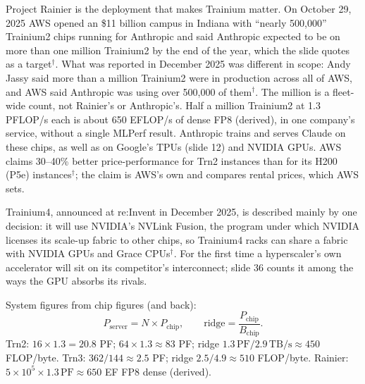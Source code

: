 \documentclass[11pt,letterpaper]{article}
\newenvironment{formulas}{\begin{tcolorbox}[formulabox]}{\end{tcolorbox}}
\begin{document}
Project Rainier is the deployment that makes Trainium matter. On October 29, 2025 AWS opened an \$11 billion campus in Indiana with ``nearly 500{,}000'' Trainium2 chips running for Anthropic and said Anthropic expected to be on more than one million Trainium2 by the end of the year, which the slide quotes as a target$^\dagger$. What was reported in December 2025 was different in scope: Andy Jassy said more than a million Trainium2 were in production across all of AWS, and AWS said Anthropic was using over 500{,}000 of them$^\dagger$. The million is a fleet-wide count, not Rainier's or Anthropic's. Half a million Trainium2 at 1.3 PFLOP/s each is about 650 EFLOP/s of dense FP8 (derived), in one company's service, without a single MLPerf result. Anthropic trains and serves Claude on these chips, as well as on Google's TPUs (slide 12) and NVIDIA GPUs. AWS claims 30--40\% better price-performance for Trn2 instances than for its H200 (P5e) instances$^\dagger$; the claim is AWS's own and compares rental prices, which AWS sets.

Trainium4, announced at re:Invent in December 2025, is described mainly by one decision: it will use NVIDIA's NVLink Fusion, the program under which NVIDIA licenses its scale-up fabric to other chips, so Trainium4 racks can share a fabric with NVIDIA GPUs and Grace CPUs$^\dagger$. For the first time a hyperscaler's own accelerator will sit on its competitor's interconnect; slide 36 counts it among the ways the GPU absorbs its rivals.

\begin{formulas}
System figures from chip figures (and back):
\[
P_{\text{server}} = N\times P_{\text{chip}},\qquad
\text{ridge} = \frac{P_{\text{chip}}}{B_{\text{chip}}} .
\]
Trn2: $16\times1.3 = 20.8$ PF; $64\times1.3\approx83$ PF; ridge $1.3\,\text{PF}/2.9\,\text{TB/s}\approx 450$ FLOP/byte. Trn3: $362/144\approx2.5$ PF; ridge $2.5/4.9\approx 510$ FLOP/byte. Rainier: $5\times10^{5}\times1.3\,\text{PF}\approx 650$ EF FP8 dense (derived).
\end{formulas}
\end{document}
